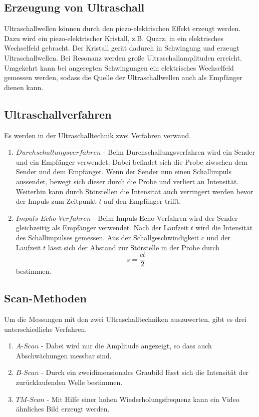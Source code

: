 \subsection{Erzeugung von Ultraschall}
\label{sec:Ultraschall}
Ultraschallwellen können durch den piezo-elektrischen Effekt erzeugt werden. Dazu wird ein piezo-elektrischer
Kristall, z.B. Quarz, in ein elektrisches Wechselfeld gebracht. Der Kristall gerät dadurch in Schwingung und
erzeugt Ultraschallwellen. Bei Resonanz werden große Ultraschallamplituden erreicht.\\
Umgekehrt kann bei angeregten Schwingungen ein elektrisches Wechselfeld gemessen werden, sodass die Quelle
der Ultraschallwellen auch als Empfänger dienen kann.

\subsection{Ultraschallverfahren}
\label{sec:Ultraschallverfahren}
Es werden in der Ultraschalltechnik zwei Verfahren verwand.
\begin{enumerate}
    \item $Durchschallungsverfahren$ - Beim Durchschallungsverfahren wird ein Sender und ein Empfänger verwendet. Dabei befindet sich die
    Probe ziwschen dem Sender und dem Empfänger. Wenn der Sender nun einen Schallimpuls aussendet, bewegt sich
    dieser durch die Probe und verliert an Intensität. Weiterhin kann durch Störstellen die Intensität auch
    verringert werden bevor der Impuls zum Zeitpunkt $t$ auf den Empfänger trifft.
    \item $Impuls$-$Echo$-$Verfahren$ - Beim Impuls-Echo-Verfahren wird der Sender gleichzeitig als Empfänger verwendet. Nach der Laufzeit
    $t$ wird die Intensität des Schallimpulses gemessen. Aus der Schallgeschwindigkeit $c$ und der Laufzeit $t$
    lässt sich der Abstand zur Störstelle in der Probe durch
    \begin{equation}
        \label{eqn:Strecke}
        s = \frac{ct}{2}
    \end{equation}
    bestimmen.
\end{enumerate}

\subsection{Scan-Methoden}
\label{sec:Scan}
Um die Messungen mit den zwei Ultraschalltechniken auszuwerten, gibt es drei unterschiedliche Verfahren.
\begin{enumerate}
    \item $A$-$Scan$ - Dabei wird nur die Amplitude angezeigt, so dass auch Abschwächungen messbar sind.
    \item $B$-$Scan$ - Durch ein zweidimensionales Graubild lässt sich die Intensität der zurücklaufenden
    Welle bestimmen.
    \item $TM$-$Scan$ - Mit Hilfe einer hohen Wiederholungsfrequenz kann ein Video ähnliches Bild erzeugt
    werden.
\end{enumerate}